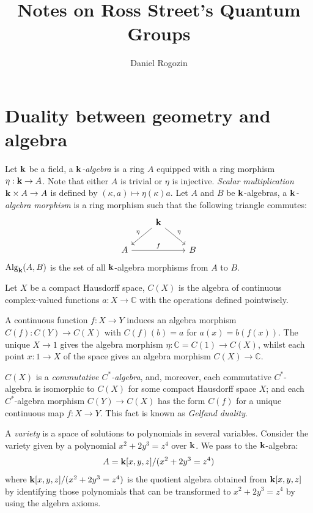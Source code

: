 \documentclass[8pt]{article}
\title{Notes on Ross Street's Quantum Groups}
\author{Daniel Rogozin}
\date{ }
\theoremstyle{definition}
\theoremstyle{definition}
\theoremstyle{definition}
\theoremstyle{definition}
\theoremstyle{definition}
\theoremstyle{definition}
\theoremstyle{definition}
\theoremstyle{definition}
\theoremstyle{definition}
\theoremstyle{definition}
\theoremstyle{definition}
\theoremstyle{definition}
\theoremstyle{definition}
\theoremstyle{definition}
\theoremstyle{question}
\begin{document}
\maketitle
\tableofcontents

\section{Duality between geometry and algebra}

Let ${\bf k}$ be a field, a \emph{${\bf k}$-algebra} is a ring $A$ equipped with a ring morphism
$\eta : {\bf k} \to A$. Note that either $A$ is trivial or $\eta$ is injective. 
\emph{Scalar multiplication} ${\bf k} \times A \to A$ is defined by $(\kappa, a) \mapsto \eta(\kappa) a$.
Let $A$ and $B$ be ${\bf k}$-algebras, a \emph{${\bf k}$-algebra morphism} is a ring morphism such that
the following triangle commutes:
\[
\begin{tikzcd}
  & {\bf k} \ar[dl, "\eta"'] \ar[dr, "\eta"] \\
  A \ar[rr, "f"] && B
\end{tikzcd}
\]
$\operatorname{Alg}_{\bf k}(A, B)$ is the set of all ${\bf k}$-algebra morphisms from $A$ to $B$.

\vspace{\baselineskip}

Let $X$ be a compact Hausdorff space, $C(X)$ is the algebra of continuous complex-valued
functions $a : X \to \mathbb{C}$ with the operations defined pointwisely.

A continuous function $f : X \to Y$ induces an algebra morphism $C(f) : C(Y) \to C(X)$
with $C(f)(b) = a$ for $a(x) = b(f(x))$. The unique $X \to 1$ gives the algebra
morphism $\eta : \mathbb{C} = C(1) \to C(X)$, whilst each point $x : 1 \to X$
of the space gives an algebra morphism $C(X) \to \mathbb{C}$.

$C(X)$ is a \emph{commutative $C^*$-algebra}, and, moreover, each commutative $C^*$-algebra
is isomorphic to $C(X)$ for some compact Hausdorff space $X$; and each 
$C^*$-algebra morphism $C(Y) \to C(X)$ has the form $C(f)$ for a unique continuous
map $f : X \to Y$. This fact is known as \emph{Gelfand duality}.

\vspace{\baselineskip}

A \emph{variety} is a space of solutions to polynomials in several variables. Consider
the variety given by a polynomial $x^2 + 2y^3 = z^4$ over ${\bf k}$.
We pass to the ${\bf k}$-algebra:
\[
A = {\bf k}[x,y,z]/(x^2 + 2y^3 = z^4)
\]
where ${\bf k}[x,y,z]/(x^2 + 2y^3 = z^4)$ is the quotient algebra obtained from ${\bf k}[x,y,z]$
by identifying those polynomials that can be transformed to $x^2 + 2y^3 = z^4$ by using
the algebra axioms.
\end{document}
